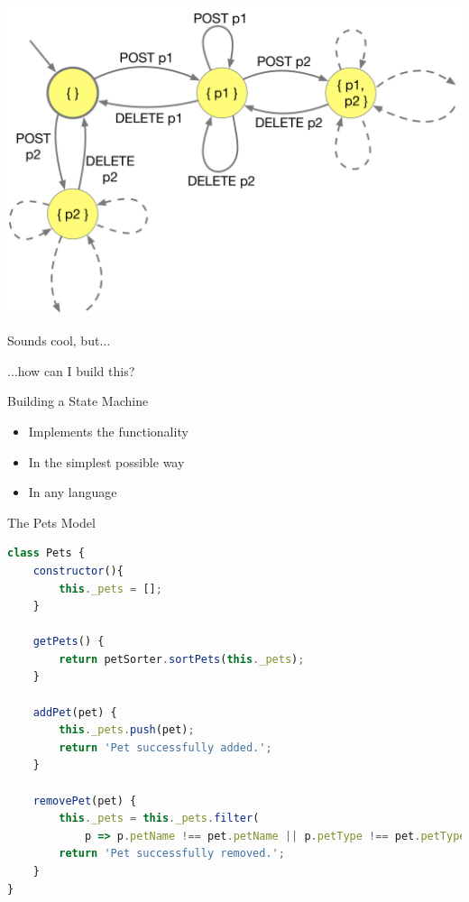 \begin{frame}[fragile]{}

\includegraphics[width=\textwidth]{images/statemachine.pdf}

\end{frame}


\begin{frame}[fragile]{}

\begin{center}
{\Huge
Sounds cool, but$\ldots$

\vspace{1.5em}
$\ldots$how can I build this?
}
\end{center}

\end{frame}

\begin{frame}[fragile]{Building a State Machine}

\begin{itemize}
\item Implements the functionality
\item In the simplest possible way
\item In any language
\end{itemize}

\end{frame}

\begin{frame}[fragile]{The Pets Model}

\begin{lstlisting}[language=JavaScript]
class Pets {
    constructor(){
        this._pets = [];
    }

    getPets() {
        return petSorter.sortPets(this._pets);
    }

    addPet(pet) {
        this._pets.push(pet);
        return 'Pet successfully added.';
    }

    removePet(pet) {
        this._pets = this._pets.filter(
            p => p.petName !== pet.petName || p.petType !== pet.petType);
        return 'Pet successfully removed.';
    }
}
\end{lstlisting}

\end{frame}

